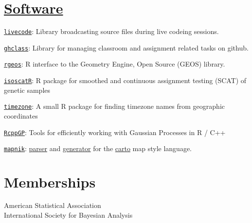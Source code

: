 \documentclass[margin,line]{res}
\begin{document}
\begin{resume}
\vspace{4mm}

\section{\sc \href{https://github.com/rundel/}{Software}}

\href{https://github.com/rundel/livecode}{\texttt{livecode}}: Library broadcasting source files during live codeing sessions.


\href{https://github.com/rundel/ghclass}{\texttt{ghclass}}: Library for managing classroom and assignment related tasks on github.

\href{https://github.com/rundel/rgeos}{\texttt{rgeos}}: R interface to the Geometry Engine, Open Source (GEOS) library.

\vspace{-0.15cm}
\href{https://github.com/rundel/isoscatR}{\texttt{isoscatR}}: R package for smoothed and continuous assignment testing (SCAT) of genetic samples

\vspace{-0.15cm}
\href{https://github.com/rundel/timezone}{\texttt{timezone}}: A small R package for finding timezone names from geographic coordinates

\vspace{-0.15cm}
\href{https://github.com/rundel/RcppGP}{\texttt{RcppGP}}: Tools for efficiently working with Gaussian Processes in R / C++

\vspace{-0.15cm}
\href{http://mapnik.org}{\texttt{mapnik}}: \href{https://github.com/rundel/carto-parser}{parser} and \href{https://github.com/rundel/carto-generator}{generator} for the \href{https://github.com/mapbox/carto}{carto} map style language.

\vspace{4mm}

\section{\sc Memberships}
American Statistical Association \\
International Society for Bayesian Analysis

\end{resume}
\end{document}
